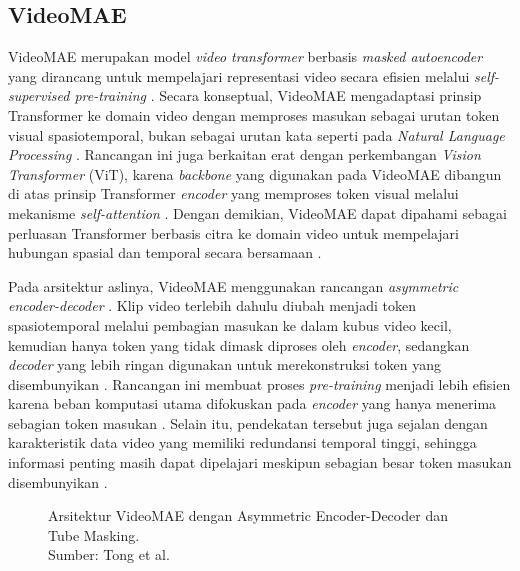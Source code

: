 \subsection{VideoMAE} \label{II.Teori6}
VideoMAE merupakan model \textit{video transformer} berbasis \textit{masked autoencoder} yang dirancang untuk mempelajari representasi video secara efisien melalui \textit{self-supervised pre-training} \cite{tong2022videomaemaskedautoencodersdataefficient}. Secara konseptual, VideoMAE mengadaptasi prinsip Transformer ke domain video dengan memproses masukan sebagai urutan token visual spasiotemporal, bukan sebagai urutan kata seperti pada \textit{Natural Language Processing} \cite{vaswani2023attentionneed}. Rancangan ini juga berkaitan erat dengan perkembangan \textit{Vision Transformer} (ViT), karena \textit{backbone} yang digunakan pada VideoMAE dibangun di atas prinsip Transformer \textit{encoder} yang memproses token visual melalui mekanisme \textit{self-attention} \cite{dosovitskiy2021imageworth16x16words}\cite{tong2022videomaemaskedautoencodersdataefficient}. Dengan demikian, VideoMAE dapat dipahami sebagai perluasan Transformer berbasis citra ke domain video untuk mempelajari hubungan spasial dan temporal secara bersamaan \cite{dosovitskiy2021imageworth16x16words}\cite{tong2022videomaemaskedautoencodersdataefficient}\cite{vaswani2023attentionneed}. \par

Pada arsitektur aslinya, VideoMAE menggunakan rancangan \textit{asymmetric encoder-decoder} \cite{tong2022videomaemaskedautoencodersdataefficient}. Klip video terlebih dahulu diubah menjadi token spasiotemporal melalui pembagian masukan ke dalam kubus video kecil, kemudian hanya token yang tidak dimask diproses oleh \textit{encoder}, sedangkan \textit{decoder} yang lebih ringan digunakan untuk merekonstruksi token yang disembunyikan \cite{tong2022videomaemaskedautoencodersdataefficient}. Rancangan ini membuat proses \textit{pre-training} menjadi lebih efisien karena beban komputasi utama difokuskan pada \textit{encoder} yang hanya menerima sebagian token masukan \cite{tong2022videomaemaskedautoencodersdataefficient}. Selain itu, pendekatan tersebut juga sejalan dengan karakteristik data video yang memiliki redundansi temporal tinggi, sehingga informasi penting masih dapat dipelajari meskipun sebagian besar token masukan disembunyikan \cite{tong2022videomaemaskedautoencodersdataefficient}. \par

\begin{figure}[htbp]
	\centering
	\caption{Arsitektur VideoMAE dengan Asymmetric Encoder-Decoder dan Tube Masking.\\Sumber: Tong et al. \cite{tong2022videomaemaskedautoencodersdataefficient}}
	\label{fig:arsitektur-videomae}
\end{figure}


